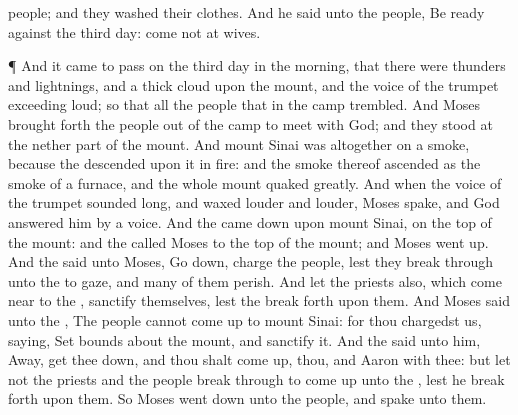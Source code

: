 {people; and they
washed their
clothes.
And he
said unto the
people,
Be
ready against the
third
day:
come not at
{}
wives.
\par }{\PP {}¶ And it came to pass on the
third
day in the
morning, that there were
thunders and
lightnings, and a
thick
cloud upon the
mount, and the
voice of the
trumpet
exceeding
loud; so that all the
people that
{} in the
camp
trembled.
And
Moses brought
forth the
people out of the
camp to
meet with
God; and they
stood at the
nether part of the
mount.
And
mount
Sinai was altogether on a
smoke,
because the
{}
descended upon it in
fire: and the
smoke thereof
ascended as the
smoke of a
furnace, and the whole
mount
quaked
greatly.
And when the
voice of the
trumpet
sounded
long, and waxed
louder and
louder,
Moses
spake, and
God
answered him by a
voice.
And the
{} came
down upon
mount
Sinai, on the
top of the
mount: and the
{}
called
Moses
{}
to the
top of the
mount; and
Moses went
up.
And the
{}
said unto
Moses, Go
down,
charge the
people, lest they break
through unto the
{} to
gaze, and
many of them
perish.
And let the
priests also, which come
near to the
{},
sanctify themselves, lest the
{} break
forth upon them.
And
Moses
said unto the
{}, The
people
cannot come
up to
mount
Sinai: for thou
chargedst us,
saying, Set
bounds about the
mount, and
sanctify it.
And the
{}
said unto him,
Away, get thee
down, and thou shalt come
up, thou, and
Aaron with thee: but let not the
priests and the
people break
through to come
up unto the
{}, lest he break
forth upon them.
So
Moses went
down unto the
people, and
spake unto them.

}
